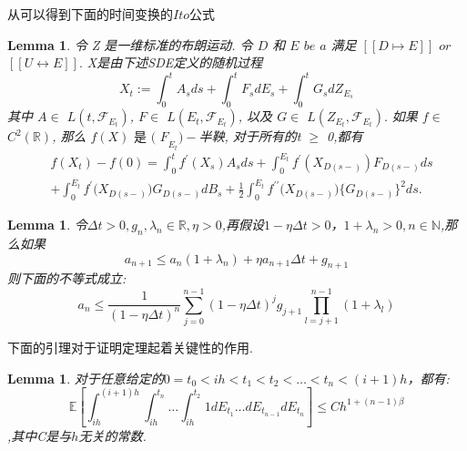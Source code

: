 \documentclass[12pt,final]{article}
\numberwithin{equation}{section}
\numberwithin{figure}{section}
\numberwithin{table}{section}
\theoremstyle{plain}
\newtheorem{lemma}[theorem]{Lemma}      %
\theoremstyle{definition}
\theoremstyle{remark}
\begin{document}
从\cite{umarov2018beyond}可以得到下面的时间变换的$Ito$公式
\begin{lemma}\label{ito}
	 令 Z 是一维标准的布朗运动. 令 $D$ 和 $E$ $be$ $a$ 满足 $[ [ D\longmapsto E] ]$ $or$ $[ [ U\longleftrightarrow E] ] .$ X是由下述SDE定义的随机过程
	$$X_t:=\int_0^tA_sds+\int_0^tF_sdE_s+\int_0^tG_sdZ_{E_s}$$
	其中 $A\in$ $L( t, \mathcal{F} _{E_t})$, $F\in$ $L( E_t, \mathcal{F} _{E_t})$, 以及 $G\in$ $L( Z_{E_t}, \mathcal{F} _{E_t}) .$ 如果 $f\in$ $C^2( \mathbb{R} )$, 那么
	$f( X) \textit{ 是 ( F}_{E_t}) - $半鞅, 对于所有的t $\ge$ 0,都有
	$$\begin{aligned}
		&f(X_{t})-f(0)=\int_{0}^{t}f^{\prime}(X_{s})A_{s}ds+\int_{0}^{E_{t}}f^{\prime}\left(X_{D(s-)}\right)F_{D(s-)}ds\\
		&+\int_{0}^{E_{t}}f^{\prime}\big(X_{D(s-)}\big)G_{D(s-)}dB_{s}+\frac{1}{2}\int_{0}^{E_{t}}f^{\prime\prime}\big(X_{D(s-)}\big)\big\{G_{D(s-)}\big\}^{2}ds.
	\end{aligned}$$
\end{lemma}
\begin{lemma}\label{lemma:1}
	令$\Delta t > 0,g_n,\lambda _n \in \mathbb{R},\eta > 0$,再假设$1-\eta \Delta t > 0$，$1 + \lambda _n > 0,n \in \mathbb{N}$,那么如果
	\begin{equation*}
		a_{n+1} \leq a_n(1+\lambda _n)+\eta a_{n+1}\Delta t +g_{n+1}
	\end{equation*}
	则下面的不等式成立:
	\begin{equation}
		a_n \leq \frac{1}{(1-\eta\Delta t)^n}\sum\limits_{j=0}^{n-1}(1-\eta\Delta t)^jg_{j+1}\prod\limits_{l=j+1}^{n-1}(1+\lambda _l)
	\end{equation}
\end{lemma}
下面的引理对于证明定理起着关键性的作用.
\begin{lemma}\label{lemma:2}
	对于任意给定的$0 = t_0 < ih < t_1 < t_2 < \ldots <t_n <(i+1)h$，都有:
	\begin{equation}
		\mathbb{E}\left[\int_{ih}^{(i+1)h}
		\int_{ih}^{t_n} \ldots \int_{ih}^{t_2} 1 dE_{t_1} \ldots dE_{t_{n-1}}dE_{t_n}\right] \le Ch^{1+(n-1)\beta}
	\end{equation}
	,其中C是与$h$无关的常数.
\end{lemma}
\end{document}
